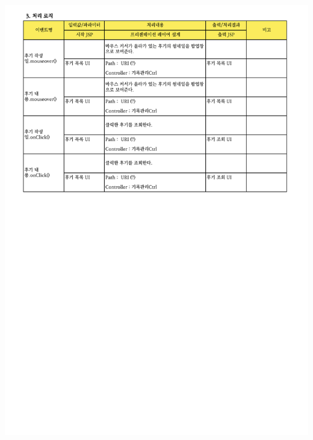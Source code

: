 {{{{{{{{{{{{{{{{{{{{{{{{{{{{{{{{{{{{{{{{{{{{{{{{{{{{{{{{{{{{{{{{{{{{{{{{{{{{{\includegraphics[width=20cm]{./Figure/Design/Display/review/review_08.pdf} \\
}}}}}}}}}}}}}}}}}}}}}}}}}}}}}}}}}}}}}}}}}}}}}}}}}}}}}}}}}}}}}}}}}}}}}}}}}}}}}
